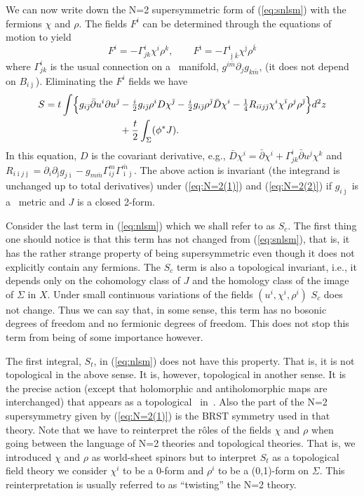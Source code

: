 We can now write down the N=2 supersymmetric form
of (\ref{eq:snlsm}) with the fermions $\chi$ and $\rho$. The fields
$F^i$ can be determined through the equations of motion to yield
\begin{equation}
  F^i=-\Gamma^i_{jk}\chi^i\rho^k,\quad\quad
  F^{\bar\imath}=-\Gamma^{\bar\imath}_{\bar\jmath\bar k}
	\chi^{\bar\jmath}\rho^{\bar k}
\end{equation}
where $\Gamma^i_{jk}$ is the usual connection on a \K\ manifold,
$g^{i\bar m}\partial_jg_{k\bar m}$, (it does not depend on
$B_{i\bar\jmath}$). Eliminating the $F^i$ fields we have
\begin{equation}
\begin{split}
  S=t\int\Bigl\{g_{i\bar\jmath}\bar\partial u^i\partial u^{\bar\jmath}
	&- {\textstyle\frac{i}{2}}g_{i\bar\jmath}\rho^iD\chi^{\bar\jmath}
	- {\textstyle\frac{i}{2}}g_{i\bar\jmath}\rho^{\bar\jmath}\bar D\chi^i
	- {\textstyle\frac{1}{4}}R_{i\bar\imath j\bar\jmath}\chi^i\chi^{\bar\imath}
	\rho^j\rho^{\bar\jmath}\Bigr\}d^2z \\
	&+ \frac t2\int_\Sigma(\phi^*J).
\end{split} \label{eq:nlsm}
\end{equation}
In this equation, $D$ is the covariant derivative, e.g., $\bar D\chi^i
= \bar\partial\chi^i+\Gamma^i_{jk}\bar\partial u^j\chi^k$ and
$R_{i\bar\imath j\bar\jmath}=\partial_i\partial_{\bar\jmath}
g_{j\bar\imath}-g_{m\bar m}\Gamma^m_{ij}
\Gamma^{\bar m}_{\bar\imath\bar\jmath}$.
The above action is invariant (the integrand is unchanged
up to total derivatives) under (\ref{eq:N=2(1)}) and
(\ref{eq:N=2(2)}) if $g_{i\bar\jmath}$ is a \K\ metric and $J$ is a
closed 2-form.

Consider the last term in (\ref{eq:nlsm}) which we shall refer to as $S_c$.
The first thing one should notice is that this term has not
changed from (\ref{eq:snlsm}), that is, it has the rather strange
property of being supersymmetric even though it does not explicitly
contain any fermions. The $S_c$ term is also a topological
invariant, i.e., it depends only on the cohomology class of $J$ and
the homology class of the image of $\Sigma$ in $X$.
Under small continuous variations of the fields $(u^i,\chi^i,\rho^i)$
$S_c$ does not change.
Thus we can say
that, in some sense, this term has no bosonic degrees of freedom and no
fermionic degrees of freedom. This does not stop this term from being
of some importance however.

The first integral, $S_t$, in (\ref{eq:nlsm}) does not have this
property. That is, it is not topological in the above sense. It is,
however, topological in another sense. It is the precise action
(except that holomorphic and antiholomorphic maps are interchanged) that
appears as a topological \nlsm\ in~\cite{W:tsm}. Also the part of the
N=2 supersymmetry given by (\ref{eq:N=2(1)}) is the BRST symmetry used
in that theory. Note that we have to reinterpret the r\^oles of the
fields $\chi$ and $\rho$ when going between the language of N=2
theories and topological theories. That is, we introduced $\chi$ and
$\rho$ as world-sheet spinors but to interpret $S_t$ as a topological
field theory we consider $\chi^i$ to be a 0-form and $\rho^i$ to be a
(0,1)-form on $\Sigma$. This reinterpretation is usually referred to
as ``twisting'' the N=2 theory.

